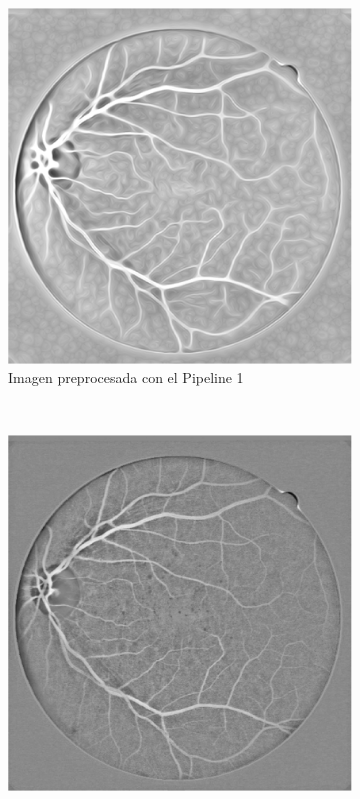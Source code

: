\begin{figure} [H] 
    \centering
    \begin{subfigure}[b]{0.3\textwidth}
        \includegraphics[width=\textwidth]{Figures/DRIVE/DRIVE_Pip1_21_training_cropped}
        \caption{Imagen preprocesada con el Pipeline 1}
        \label{fig:gull}
    \end{subfigure}
    ~ %
    \begin{subfigure}[b]{0.3\textwidth}
        \includegraphics[width=\textwidth]{Figures/DRIVE/DRIVE_Pip3_21_training_cropped}

\end{subfigure}
\end{figure}
